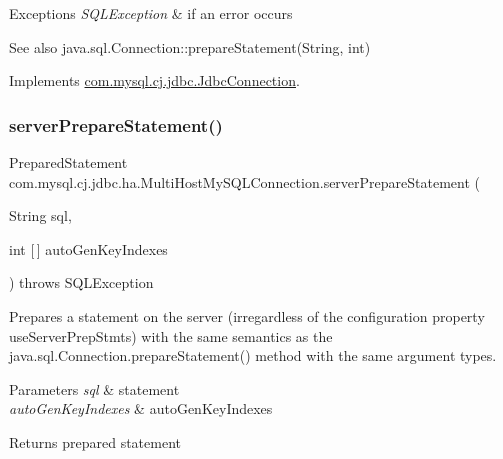 \begin{DoxyExceptions}{Exceptions}
{\em S\+Q\+L\+Exception} & if an error occurs \\
\hline
\end{DoxyExceptions}
\begin{DoxySeeAlso}{See also}
java.\+sql.\+Connection\+::prepare\+Statement(\+String, int) 
\end{DoxySeeAlso}


Implements \mbox{\hyperlink{interfacecom_1_1mysql_1_1cj_1_1jdbc_1_1_jdbc_connection_a9deb2cebf6538a53be5f24c52ee39f22}{com.\+mysql.\+cj.\+jdbc.\+Jdbc\+Connection}}.

\mbox{\label{classcom_1_1mysql_1_1cj_1_1jdbc_1_1ha_1_1_multi_host_my_s_q_l_connection_a5c69e6b4ee9462919ab63d9e3c563294}} 
\subsubsection{\texorpdfstring{server\+Prepare\+Statement()}{serverPrepareStatement()}\hspace{0.1cm}{\footnotesize\ttfamily [4/6]}}
{\footnotesize\ttfamily Prepared\+Statement com.\+mysql.\+cj.\+jdbc.\+ha.\+Multi\+Host\+My\+S\+Q\+L\+Connection.\+server\+Prepare\+Statement (\begin{DoxyParamCaption}\item[{String}]{sql,  }\item[{int \mbox{[}$\,$\mbox{]}}]{auto\+Gen\+Key\+Indexes }\end{DoxyParamCaption}) throws S\+Q\+L\+Exception}

Prepares a statement on the server (irregardless of the configuration property \textquotesingle{}use\+Server\+Prep\+Stmts\textquotesingle{}) with the same semantics as the java.\+sql.\+Connection.\+prepare\+Statement() method with the same argument types.


\begin{DoxyParams}{Parameters}
{\em sql} & statement \\
\hline
{\em auto\+Gen\+Key\+Indexes} & auto\+Gen\+Key\+Indexes \\
\hline
\end{DoxyParams}
\begin{DoxyReturn}{Returns}
prepared statement 
\end{DoxyReturn}

